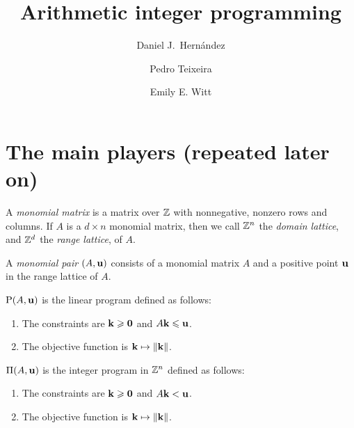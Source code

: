 \documentclass[11pt]{amsart}
\renewcommand{\!}[1]{{\color{red}\text{$\star$\,}#1\,$\star$}}
\begin{document}
\title[Arithmetic programming and Frobenius powers]{Arithmetic integer programming
}
\author{Daniel J.\ Hern\'andez}
\author{Pedro Teixeira}
\author{Emily E. Witt}
\maketitle


\section{The main players (repeated later on)}

\begin{definition}
A \emph{monomial matrix} is a matrix over $\mathbb{Z}$ with nonnegative, nonzero rows and columns.   If $A$ is a $d \times n$ monomial matrix, then we call $\mathbb{Z}^n$ the \emph{domain lattice}, and $\mathbb{Z}^d$ the \emph{range lattice}, of $A$.
\end{definition}

\begin{definition}
A \emph{monomial pair} $(A, \mathbf{u})$ consists of a monomial matrix $A$ and a positive point $\mathbf{u}$ in the range lattice of $A$.
\end{definition}




\begin{definition}
$\mathrm{P}(A, \mathbf{u})$ is the linear program defined as follows:
\begin{enumerate}
\item The constraints are $\mathbf{k} \geqslant \mathbf{0}$ and $A \mathbf{k} \leqslant \mathbf{u}$.
\item The objective function is $\mathbf{k} \mapsto \| \mathbf{k} \|$.
\end{enumerate}
\end{definition}



\begin{definition}
$\Pi(A, \mathbf{u})$ is the integer program in $\mathbb{Z}^n$ defined as follows:
\begin{enumerate}
\item The constraints are $\mathbf{k} \geqslant \mathbf{0}$ and $A \mathbf{k} < \mathbf{u}$. 
\item The objective function is $\mathbf{k} \mapsto \| \mathbf{k} \|$.
\end{enumerate}
\end{definition}
\end{document}
